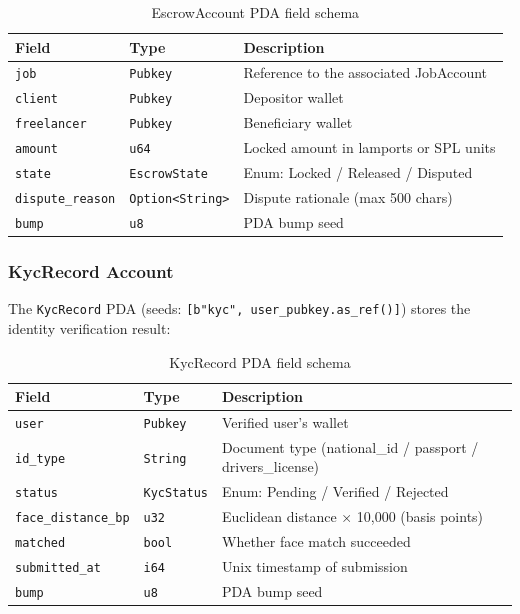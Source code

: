 \begin{table}[H]
\centering
\caption{EscrowAccount PDA field schema}
\label{table:escrow_account}
\begin{tabular}{|l|l|p{6cm}|}
\hline
\textbf{Field} & \textbf{Type} & \textbf{Description} \\ \hline
\texttt{job} & \texttt{Pubkey} & Reference to the associated JobAccount \\ \hline
\texttt{client} & \texttt{Pubkey} & Depositor wallet \\ \hline
\texttt{freelancer} & \texttt{Pubkey} & Beneficiary wallet \\ \hline
\texttt{amount} & \texttt{u64} & Locked amount in lamports or SPL units \\ \hline
\texttt{state} & \texttt{EscrowState} & Enum: Locked / Released / Disputed \\ \hline
\texttt{dispute\_reason} & \texttt{Option<String>} & Dispute rationale (max 500 chars) \\ \hline
\texttt{bump} & \texttt{u8} & PDA bump seed \\ \hline
\end{tabular}
\end{table}

\subsubsection{KycRecord Account}

The \texttt{KycRecord} PDA (seeds: \texttt{[b"kyc", user\_pubkey.as\_ref()]}) stores the identity verification result:

\begin{table}[H]
\centering
\caption{KycRecord PDA field schema}
\label{table:kyc_account}
\begin{tabular}{|l|l|p{6cm}|}
\hline
\textbf{Field} & \textbf{Type} & \textbf{Description} \\ \hline
\texttt{user} & \texttt{Pubkey} & Verified user's wallet \\ \hline
\texttt{id\_type} & \texttt{String} & Document type (national\_id / passport / drivers\_license) \\ \hline
\texttt{status} & \texttt{KycStatus} & Enum: Pending / Verified / Rejected \\ \hline
\texttt{face\_distance\_bp} & \texttt{u32} & Euclidean distance × 10,000 (basis points) \\ \hline
\texttt{matched} & \texttt{bool} & Whether face match succeeded \\ \hline
\texttt{submitted\_at} & \texttt{i64} & Unix timestamp of submission \\ \hline
\texttt{bump} & \texttt{u8} & PDA bump seed \\ \hline
\end{tabular}
\end{table}

